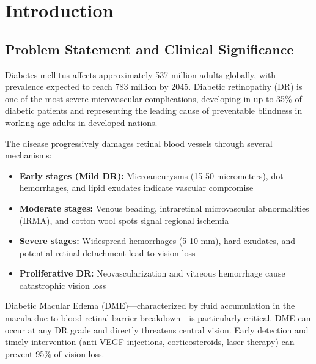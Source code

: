 \documentclass[12pt,a4paper]{article}
\begin{document}
\newpage

\tableofcontents
\newpage

\section{Introduction}

\subsection{Problem Statement and Clinical Significance}

Diabetes mellitus affects approximately 537 million adults globally, with prevalence expected to reach 783 million by 2045. Diabetic retinopathy (DR) is one of the most severe microvascular complications, developing in up to 35\% of diabetic patients and representing the leading cause of preventable blindness in working-age adults in developed nations.

The disease progressively damages retinal blood vessels through several mechanisms:

\begin{itemize}
    \item \textbf{Early stages (Mild DR):} Microaneurysms (15-50 micrometers), dot hemorrhages, and lipid exudates indicate vascular compromise
    \item \textbf{Moderate stages:} Venous beading, intraretinal microvascular abnormalities (IRMA), and cotton wool spots signal regional ischemia
    \item \textbf{Severe stages:} Widespread hemorrhages (5-10 mm), hard exudates, and potential retinal detachment lead to vision loss
    \item \textbf{Proliferative DR:} Neovascularization and vitreous hemorrhage cause catastrophic vision loss
\end{itemize}

Diabetic Macular Edema (DME)---characterized by fluid accumulation in the macula due to blood-retinal barrier breakdown---is particularly critical. DME can occur at any DR grade and directly threatens central vision. Early detection and timely intervention (anti-VEGF injections, corticosteroids, laser therapy) can prevent 95\% of vision loss.
\end{document}
